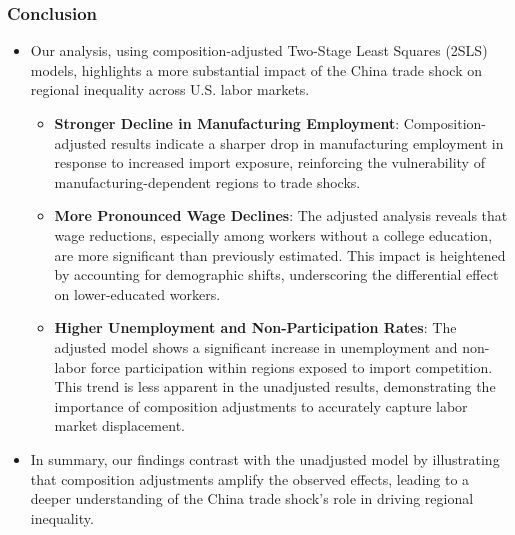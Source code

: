 \begin{frame}
    \frametitle{Conclusion}

    \begin{itemize}
        \item Our analysis, using composition-adjusted Two-Stage Least Squares (2SLS) models, highlights a more substantial impact of the China trade shock on regional inequality across U.S. labor markets.
        
        \begin{itemize}
            \item \textbf{Stronger Decline in Manufacturing Employment}: Composition-adjusted results indicate a sharper drop in manufacturing employment in response to increased import exposure, reinforcing the vulnerability of manufacturing-dependent regions to trade shocks.
            
            \item \textbf{More Pronounced Wage Declines}: The adjusted analysis reveals that wage reductions, especially among workers without a college education, are more significant than previously estimated. This impact is heightened by accounting for demographic shifts, underscoring the differential effect on lower-educated workers.
            
            \item \textbf{Higher Unemployment and Non-Participation Rates}: The adjusted model shows a significant increase in unemployment and non-labor force participation within regions exposed to import competition. This trend is less apparent in the unadjusted results, demonstrating the importance of composition adjustments to accurately capture labor market displacement.
        \end{itemize}
        
        \item In summary, our findings contrast with the unadjusted model by illustrating that composition adjustments amplify the observed effects, leading to a deeper understanding of the China trade shock’s role in driving regional inequality.
    \end{itemize}

\end{frame}
